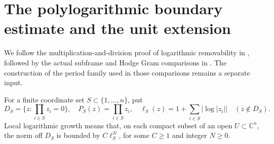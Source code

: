 \section{The polylogarithmic boundary estimate and the unit extension}
\label{sec:faithful-boundary-unit}
We follow the multiplication-and-division proof of logarithmic
removability in , followed
by the actual subframe and Hodge Gram comparisons in
. The construction of the period
family used in those comparisons remains a separate input.

For a finite coordinate set \(S\subset\{1,\ldots,n\}\), put
\[
 D_S=\{z:\prod_{i\in S}z_i=0\},\quad
 P_S(z)=\prod_{i\in S}z_i,\quad
 \ell_S(z)=1+\sum_{i\in S}|\log|z_i||\quad(z\notin D_S).
 \tag{BG1}\label{eq:faithful-log-weight}
\]
Local logarithmic growth means that, on each compact subset of
an open \(U\subset\mathbb C^n\), the norm off \(D_S\) is bounded
by \(C\ell_S^N\), for some \(C\ge1\) and integer \(N\ge0\).

